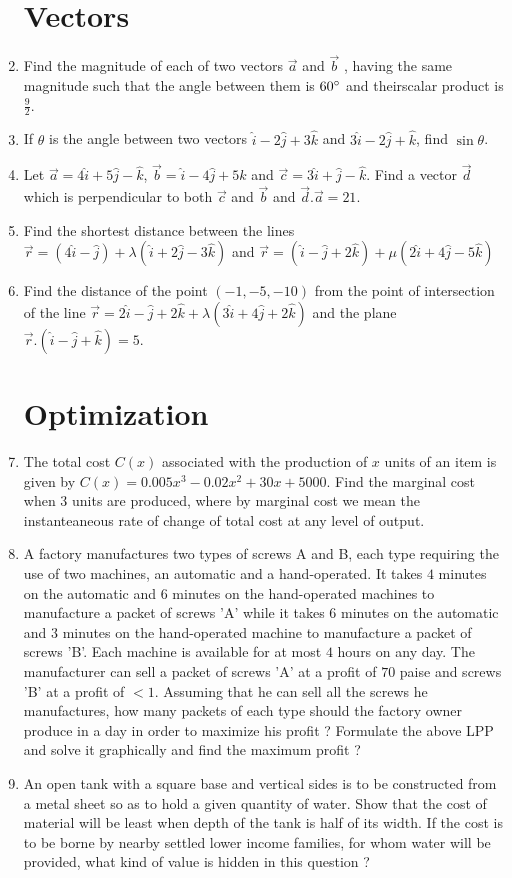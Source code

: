 \documentclass{article}
\providecommand{\brak}[1]{\ensuremath{\left(#1\right)}}
\begin{document}
\begin{enumerate}
\section{Vectors}
\item Find the magnitude of each of two vectors $\vec{a}$ and $\vec{b}$ , having the same magnitude such that the angle  between them is $60\degree{}$ and theirscalar product is $\frac{9}{2}$.
\item If $\theta$ is the angle between two vectors $\hat{i}-2\hat{j}+3\hat{k}$ and $3\hat{i}-2\hat{j}+\hat{k}$, find $\sin\theta$.
\item Let $\vec{a}=4\hat{i}+5\hat{j}-\hat{k}$, $\vec{b}=\hat{i}-4\hat{j}+5\hat{k}$ and $\vec{c}=3\hat{i}+\hat{j}-\hat{k}$. Find a vector $\vec{d}$ which is perpendicular to both $\vec{c}$ and $\vec{b}$ and $\vec{d}.\vec{a}=21$.
\item Find the shortest distance between the lines \\ $\vec{r} = \brak{4\hat{i}-\hat{j}}+\lambda\brak{\hat{i}+2\hat{j}-3\hat{k}}$ and $\vec{r} = \brak{\hat{i}-\hat{j}+2\hat{k}}+ \mu\brak{2\hat{i}+4\hat{j}-5\hat{k}}$
\item Find the distance of the point \brak{-1,-5,-10} from the point of intersection of the line $\vec{r}=2\hat{i}-\hat{j}+2\hat{k}+\lambda{\brak{3\hat{i}+4\hat{j}+2\hat{k}}}$ and the plane $\vec{r}.\brak{\hat{i}-\hat{j}+\hat{k}}=5.$
\section{Optimization}
\item The total cost $C\brak{x}$ associated with the production of $x$ units of an item is given by $C\brak{x} = 0.005x^{3} - 0.02x^{2} + 30x + 5000$. Find the marginal cost when 3 units are produced, where by marginal cost we mean the instanteaneous rate of change of total cost at any level of output.
\item A factory manufactures two types of screws A and B, each type requiring the use of two machines, an automatic and a hand-operated. It takes $4$ minutes on the automatic and $6$ minutes on the hand-operated machines to manufacture a packet of screws 'A' while it takes $6$ minutes on the automatic and $3$ minutes on the hand-operated machine to manufacture a packet of screws 'B'. Each machine is available for at most $4$ hours on any day. The manufacturer can sell a packet of screws 'A' at a profit of $70$ paise and screws 'B' at a profit of $< 1$. Assuming that he can sell all the screws he manufactures, how many packets of each type should the factory owner produce in a day in order to maximize his profit ? Formulate the above LPP and solve it graphically and find the maximum profit ?
\item An open tank with a square base and vertical sides is to be constructed from a metal sheet so as to hold a given quantity of water. Show that the cost of material will be least when depth of the tank is half of its width. If the cost is to be borne by nearby settled lower income families, for whom water will be provided, what kind of value is hidden in this question ?  	

\end{enumerate}
\end{document}
